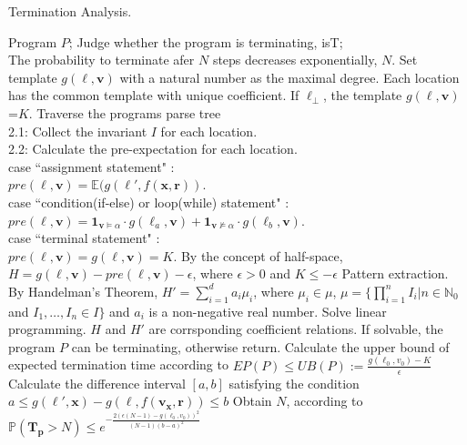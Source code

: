 \documentclass[runningheads]{llncs}
\begin{document}
\begin{algorithm}[htb]  
	\caption{Termination Analysis.}  
	\label{TA}  
	\begin{algorithmic}[1]  
		\REQUIRE 
		Program $P$; 
		\ENSURE  
		Judge whether the program is terminating, isT;\\
		The probability to terminate afer $N$ steps decreases exponentially, $N$.
		\STATE Set template $g(\ell,\boldsymbol{v})$ with a natural number as the maximal degree. Each location has the common template with unique coefficient. If $\ell_{\bot}$, the template $g(\ell,\boldsymbol{v})$=$K$.
		\STATE Traverse the programs parse tree \\
		2.1: Collect the invariant $I$ for each location.\\
		2.2: Calculate the pre-expectation for each location.\\
		\quad \quad case ``assignment statement" :\\
		\quad \quad \quad \quad $pre(\ell,\boldsymbol{v})= \mathbb{E}(g(\ell',f(\boldsymbol{x},\boldsymbol{r}))$.\\
		\quad \quad case ``condition(if-else) or loop(while) statement" :\\
		\quad \quad \quad \quad $pre(\ell,\boldsymbol{v})=\textbf{1}_{\boldsymbol{v}\vDash\alpha} \cdot g(\ell_a,\boldsymbol{v})+\textbf{1}_{\boldsymbol{v}\nvDash\alpha} \cdot g(\ell_b,\boldsymbol{v})$.\\
		\quad \quad case ``terminal statement" :\\
		\quad \quad \quad \quad $pre(\ell,\boldsymbol{v})=g(\ell,\boldsymbol{v})=K$.
		\STATE By the concept of half-space, $H=g(\ell,\boldsymbol{v})-pre(\ell,\boldsymbol{v})-\epsilon$, where $\epsilon >0$ and $K \leq -\epsilon$
		\STATE Pattern extraction. By Handelman's Theorem, $H'=\sum\limits_{i=1}^{d} a_i \mu_i$, where $\mu_i \in \mu$, $\mu=\{\prod\limits_{i=1}^{n} I_i | n\in\mathbb{N}_0$ and $ I_1,\dots,I_n \in I\}$ and $a_i$ is a non-negative real number.
		\STATE Solve linear programming. $H$ and $H'$ are corrsponding coefficient relations. If solvable, the program $P$ can be terminating, otherwise return.
		\STATE Calculate the upper bound of expected termination time according to $EP(P)\leq UB(P):=\frac{g(\ell_0,v_0)-K}{\epsilon}$
		\STATE Calculate the difference interval $[a,b]$ satisfying the condition $a\leq g(\ell',\boldsymbol{x})-g(\ell,f(\boldsymbol{v_x},\boldsymbol{r}))\leq b$
		\STATE Obtain $N$, according to $\mathbb{P}(\bm{T_p} > N) \leq e^{-\frac{2(\epsilon(N-1)-g(\ell_0,v_0))^2}{(N-1)(b-a)^2}}$
	\end{algorithmic}  
\end{algorithm} 
\end{document}
